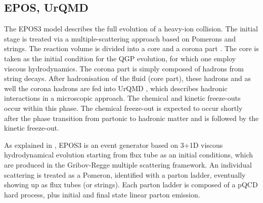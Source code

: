 \newpage

\subsection{EPOS, UrQMD}
The EPOS3 model \cite{cite:EPOSa, cite:EPOSb, cite:EPOSc} describes the full evolution of a heavy-ion collision. The initial stage is treated via a multiple-scattering approach based on Pomerons and strings. The reaction volume is divided into a core and a corona part \cite{cite:EPOSd}. The core is taken as the initial condition for the QGP evolution, for which one employ viscous hydrodynamics. The corona part is simply composed of hadrons from string decays. After hadronisation of the fluid (core part), these hadrons and as well the corona hadrons are fed into UrQMD \cite{cite:URQMDa, cite:URQMDb}, which describes hadronic interactions in a microscopic approach. The chemical and kinetic freeze-outs occur within this phase. The chemical freeze-out is expected to occur shortly after the phase transition from partonic to hadronic matter and is followed by the kinetic freeze-out.


As explained in \cite{cite:EPOSa, cite:EPOSb, cite:EPOSc, cite:EPOSd}, EPOS3 is an event generator based on 3+1D viscous hydrodynamical evolution starting from flux tube as an initial conditions, which are produced in the Gribov-Regge multiple scattering framework. An individual scattering is treated as a Pomeron, identified with a parton ladder, eventually showing up as flux tubes (or strings). Each parton ladder is composed of a pQCD hard process, plus initial and final state linear parton emission. 


